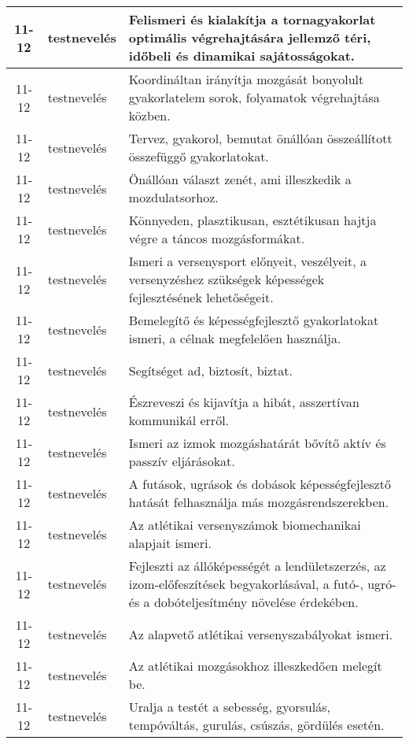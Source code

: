 \begin{small}
\begin{longtable}{c | p{2cm} |  p{11cm} }
              11-12 & testnevelés & Felismeri és kialakítja a tornagyakorlat optimális végrehajtására jellemző téri, időbeli és dinamikai sajátosságokat. \\ \hline
              11-12 & testnevelés & Koordináltan irányítja mozgását bonyolult gyakorlatelem sorok, folyamatok végrehajtása közben. \\ \hline
              11-12 & testnevelés & Tervez, gyakorol, bemutat önállóan összeállított összefüggő gyakorlatokat. \\ \hline
              11-12 & testnevelés & Önállóan választ zenét, ami illeszkedik a mozdulatsorhoz. \\ \hline
              11-12 & testnevelés & Könnyeden, plasztikusan, esztétikusan hajtja végre a táncos mozgásformákat. \\ \hline
              11-12 & testnevelés & Ismeri a versenysport előnyeit, veszélyeit, a versenyzéshez szükségek képességek fejlesztésének lehetőségeit. \\ \hline
              11-12 & testnevelés & Bemelegítő és képességfejlesztő gyakorlatokat ismeri, a célnak megfelelően használja. \\ \hline
              11-12 & testnevelés & Segítséget ad, biztosít, biztat. \\ \hline
              11-12 & testnevelés & Észreveszi és kijavítja a hibát, asszertívan kommunikál erről. \\ \hline
              11-12 & testnevelés & Ismeri az izmok mozgáshatárát bővítő aktív és passzív eljárásokat. \\ \hline
              11-12 & testnevelés & A futások, ugrások és dobások képességfejlesztő hatását felhasználja más mozgásrendszerekben. \\ \hline
              11-12 & testnevelés & Az atlétikai versenyszámok biomechanikai alapjait ismeri. \\ \hline
              11-12 & testnevelés & Fejleszti az állóképességét a lendületszerzés, az izom-előfeszítések begyakorlásával, a futó-, ugró- és a dobóteljesítmény növelése érdekében. \\ \hline
              11-12 & testnevelés & Az alapvető atlétikai versenyszabályokat ismeri. \\ \hline
              11-12 & testnevelés & Az atlétikai mozgásokhoz illeszkedően melegít be. \\ \hline
              11-12 & testnevelés & Uralja a testét a sebesség, gyorsulás, tempóváltás, gurulás, csúszás, gördülés esetén. \\ \hline

\end{longtable}
\end{small}

